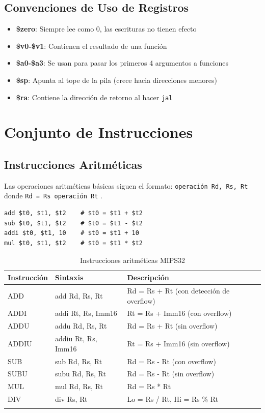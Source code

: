 \documentclass[12pt]{article}
\begin{document}
\subsection{Convenciones de Uso de Registros}

\begin{itemize}
    \item \textbf{\$zero}: Siempre lee como 0, las escrituras no tienen efecto
    \item \textbf{\$v0-\$v1}: Contienen el resultado de una función
    \item \textbf{\$a0-\$a3}: Se usan para pasar los primeros 4 argumentos a funciones
    \item \textbf{\$sp}: Apunta al tope de la pila (crece hacia direcciones menores)
    \item \textbf{\$ra}: Contiene la dirección de retorno al hacer \texttt{jal}
\end{itemize}

\section{Conjunto de Instrucciones}

\subsection{Instrucciones Aritméticas}

Las operaciones aritméticas básicas siguen el formato: \texttt{operación Rd, Rs, Rt} donde \texttt{Rd = Rs operación Rt} \cite{mipsguide}.

\begin{lstlisting}[caption=Ejemplos de instrucciones aritméticas, label=lst:aritmeticas]
add $t0, $t1, $t2    # $t0 = $t1 + $t2
sub $t0, $t1, $t2    # $t0 = $t1 - $t2
addi $t0, $t1, 10    # $t0 = $t1 + 10
mul $t0, $t1, $t2    # $t0 = $t1 * $t2
\end{lstlisting}

\begin{longtable}{|l|l|l|}
    \hline
    \textbf{Instrucción} & \textbf{Sintaxis} & \textbf{Descripción} \\
    \hline
    ADD & add Rd, Rs, Rt & Rd = Rs + Rt (con detección de overflow) \\
    \hline
    ADDI & addi Rt, Rs, Imm16 & Rt = Rs + Imm16 (con overflow) \\
    \hline
    ADDU & addu Rd, Rs, Rt & Rd = Rs + Rt (sin overflow) \\
    \hline
    ADDIU & addiu Rt, Rs, Imm16 & Rt = Rs + Imm16 (sin overflow) \\
    \hline
    SUB & sub Rd, Rs, Rt & Rd = Rs - Rt (con overflow) \\
    \hline
    SUBU & subu Rd, Rs, Rt & Rd = Rs - Rt (sin overflow) \\
    \hline
    MUL & mul Rd, Rs, Rt & Rd = Rs * Rt \\
    \hline
    DIV & div Rs, Rt & Lo = Rs / Rt, Hi = Rs \% Rt \\
    \hline
    \caption{Instrucciones aritméticas MIPS32}
\end{longtable}
\end{document}
